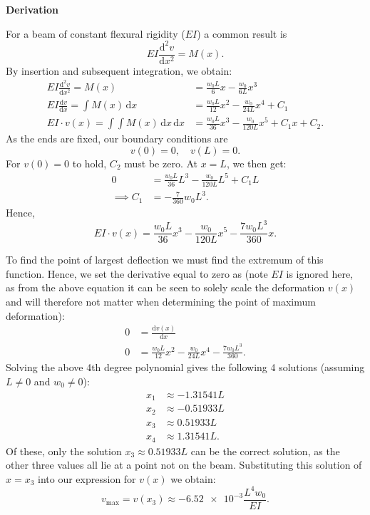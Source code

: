\documentclass[a4paper]{article}
\numberwithin{equation}{problem}
\newcommand{\AUheading}[1]{%
  \par\vspace{.4\baselineskip}%
  {\sffamily\bfseries\color{AUblueDark}#1\par}%
  \nobreak%
}
\newenvironment{derivation}[1][Derivation]{%
  \AUheading{#1}
  \begingroup\allowdisplaybreaks
  \setlength{\abovedisplayskip}{6pt}%
  \setlength{\belowdisplayskip}{6pt}%
  \setlength{\abovedisplayshortskip}{4pt}%
  \setlength{\belowdisplayshortskip}{4pt}%
}{\par\endgroup\medskip}
\begin{document}
\begin{derivation}
  For a beam of constant flexural rigidity ($EI$) a common result is
  \begin{equation*}
    EI \frac{\mathrm{d}^2 v}{\mathrm{d}x^2} = M(x) 
  .\end{equation*}
  By insertion and subsequent integration, we obtain:
  \begin{align*}
    EI \frac{\mathrm{d}^2 v}{\mathrm{d}x^2} = M(x) &= \frac{w_0 L}{6} x - \frac{w_0}{6L}x^3 \\
    EI \frac{\mathrm{d}v}{\mathrm{d}x} = \int M(x) \, \mathrm{d}x &= \frac{w_0 L}{12} x^2 - \frac{w_0}{24L} x^{4} + C_1 \\
    EI \cdot v(x) = \int \int M(x) \, \mathrm{d}x \, \mathrm{d}x  &= \frac{w_0 L}{36}x^3 - \frac{w_0}{120 L}x^{5} + C_1 x + C_2
  .\end{align*}
  As the ends are fixed, our boundary conditions are
  \begin{equation*}
    v(0) = 0, \quad v(L) = 0
  .\end{equation*}
  For $v(0) = 0$ to hold, $C_2$ must be zero.
  At $x = L$, we then get:
  \begin{align*}
    0 &= \frac{w_0 L}{36}L^3 - \frac{w_0}{120 L}L^{5} + C_1 L \\
    \implies C_1 &= - \frac{7}{360} w_0 L^3
  .\end{align*}
  Hence,
  \begin{equation*}
    EI \cdot v(x) = \frac{w_0 L}{36} x^3 - \frac{w_0}{120 L} x^{5} - \frac{7 w_0 L^3}{360} x
  .\end{equation*}
  
  To find the point of largest deflection we must find the extremum of this function.
  Hence, we set the derivative equal to zero as (note $EI$ is ignored here, as from the above equation it can be seen to solely scale the deformation $v(x)$ and will therefore not matter when determining the point of maximum deformation):
  \begin{align*}
    0 &= \frac{\mathrm{d}v(x)}{\mathrm{d}x} \\
    0 &= \frac{w_0 L}{12} x^2 - \frac{w_0}{24 L} x^{4} - \frac{7 w_0 L^3}{360}
  .\end{align*}
  Solving the above 4th degree polynomial gives the following 4 solutions (assuming $L \neq 0$ and $w_0 \neq 0$):
  \begin{align*}
    x_1 &\approx \num{-1,31541} L \\
    x_2 &\approx \num{-0,51933} L \\
    x_3 &\approx \num{0,51933} L \\
    x_4 &\approx \num{1,31541} L
  .\end{align*}
  Of these, only the solution $x_3 \approx \num{0,51933} L$ can be the correct solution, as the other three values all lie at a point not on the beam.
  Substituting this solution of $x = x_3$ into our expression for $v(x)$ we obtain:
  \begin{equation*}
    v_{\mathrm{max}} = v(x_3) \approx \num{-6,52e-3}  \frac{L^{4}w_0}{EI}
  .\end{equation*}
\end{derivation}
\end{document}
